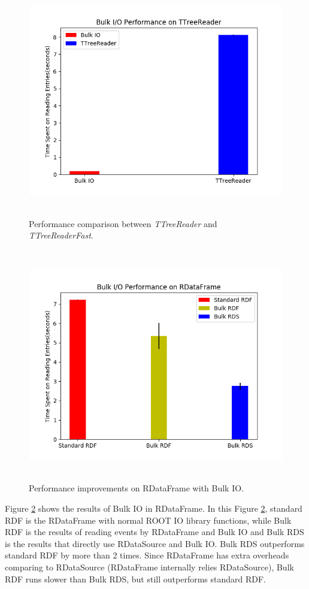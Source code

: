 \begin{figure}[!ht]
\centering
\includegraphics[height=4in, width=5in]{ttreereader.png}
\vspace*{-2mm}
\caption{Performance comparison between \textit{TTreeReader} and \textit{TTreeReaderFast}.}
\label{fig:ttreereader}
\end{figure}

\begin{figure}[!ht]
\centering
\includegraphics[height=4in, width=5in]{dataframe.png}
\vspace*{-2mm}
\caption{Performance improvements on RDataFrame with Bulk IO.}
\label{fig:rdataframe}
\end{figure}

Figure \ref{fig:rdataframe} shows the results of Bulk IO in RDataFrame. In this Figure \ref{fig:rdataframe}, standard RDF is the RDataFrame with normal ROOT IO library functions, while Bulk RDF is the results of reading events by RDataFrame and Bulk IO and Bulk RDS is the results that directly use RDataSource and Bulk IO. Bulk RDS outperforms standard RDF by more than 2 times. Since RDataFrame has extra overheads comparing to RDataSource (RDataFrame internally relies RDataSource), Bulk RDF runs slower than Bulk RDS, but still outperforms standard RDF.
